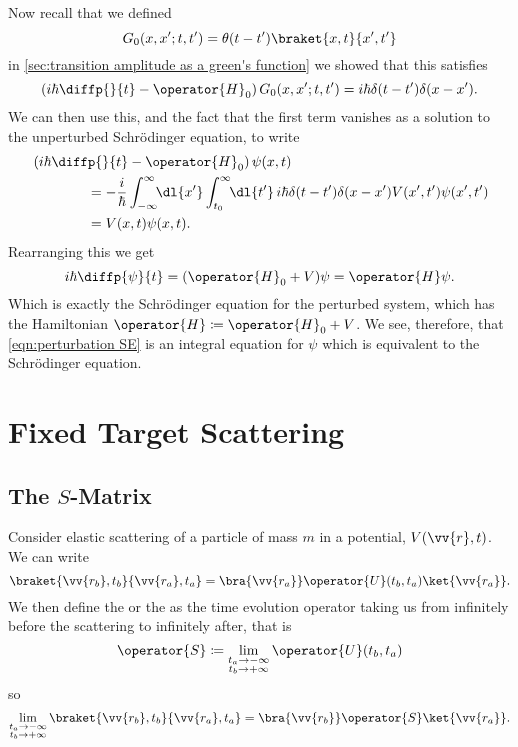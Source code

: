 \documentclass[fleqn]{NotesClass}
\newcommand*{\hamiltonian}{H}
\begin{document}
    Now recall that we defined
    \begin{equation}
        G_0(x, x'; t, t') = \theta(t - t') \braket{x, t}{x', t'}
    \end{equation}
    in \cref{sec:transition amplitude as a green's function} we showed that this satisfies
    \begin{equation}
        \left( i\hbar\diffp{}{t} - \operator{\hamiltonian}_0 \right)G_0(x, x'; t, t') = i\hbar\delta(t - t')\delta(x - x').
    \end{equation}
    We can then use this, and the fact that the first term vanishes as a solution to the unperturbed Schr\"odinger equation, to write
    \begin{align}
        &\left( i\hbar\diffp{}{t} - \operator{\hamiltonian}_0 \right)\psi(x, t)\notag\\
        &\qquad\qquad= -\frac{i}{\hbar} \int_{-\infty}^{\infty} \!\! \dl{x'} \int_{t_0}^{\infty} \!\! \dl{t'} \, i\hbar \delta(t - t')\delta(x - x') V(x', t')\psi(x', t')\\
        &\qquad\qquad= V(x, t)\psi(x, t).
    \end{align}
    Rearranging this we get
    \begin{equation}
        i\hbar\diffp{\psi}{t} = (\operator{\hamiltonian}_0 + V)\psi = \operator{\hamiltonian}\psi.
    \end{equation}
    Which is exactly the Schr\"odinger equation for the perturbed system, which has the Hamiltonian \(\operator{\hamiltonian} \coloneqq \operator{\hamiltonian}_0 + V\).
    We see, therefore, that \cref{eqn:perturbation SE} is an integral equation for \(\psi\) which is equivalent to the Schr\"odinger equation.
    
    \chapter{Fixed Target Scattering}
    \section{The \texorpdfstring{\(S\)}{S}-Matrix}
    Consider elastic scattering of a particle of mass \(m\) in a potential, \(V(\vv{r}, t)\).
    We can write
    \begin{equation}
        \braket{\vv{r_b}, t_b}{\vv{r_a}, t_a} = \bra{\vv{r_a}} \operator{U}(t_b, t_a) \ket{\vv{r_a}}.
    \end{equation}
    We then define the  or the  as the time evolution operator taking us from infinitely before the scattering to infinitely after, that is
    \begin{equation}
        \operator{S} \coloneqq \lim_{\substack{t_a\to-\infty\\t_b\to+\infty}} \operator{U}(t_b, t_a)
    \end{equation}
    so
    \begin{equation}
        \lim_{\substack{t_a\to-\infty\\t_b\to+\infty}} \braket{\vv{r_b}, t_b}{\vv{r_a}, t_a} = \bra{\vv{r_b}} \operator{S} \ket{\vv{r_a}}.
    \end{equation}
    
\end{document}

